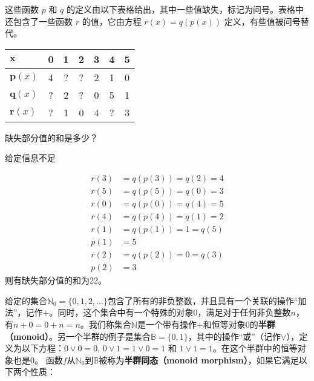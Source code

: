\documentclass[answers]{exam}
\begin{document}
\begin{questions}
	\question 这些函数 \( p \) 和 \( q \) 的定义由以下表格给出，其中一些值缺失，标记为问号。表格中还包含了一些函数 \( r
	\) 的值，它由方程 \( r(x) = q(p(x)) \) 定义，有些值被问号替代。

	\begin{tabularx}{0.8\textwidth}{|B|C|C|C|C|C|C|} \hline
		\(\mathbf x \)    & \textbf{0} & \textbf{1} & \textbf{2} & \textbf{3} & \textbf{4} & \textbf{5} \\ \hline
		\(\mathbf p(x) \) & 4          & ?          & ?          & 2          & 1          & 0          \\ \hline
		\(\mathbf q(x) \) & ?          & 2          & ?          & 0          & 5          & 1          \\ \hline
		\(\mathbf r(x) \) & ?          & 1          & 0          & 4          & ?          & 3          \\ \hline
	\end{tabularx}

	缺失部分值的和是多少？

	\begin{oneparchoices}
		    \choice 给定信息不足
	\end{oneparchoices}

	\begin{solution}
		\begin{align*}
			r(3) & = q(p(3)) = q(2) = 4   \\
			r(5) & = q(p(5)) = q(0) = 3   \\
			r(0) & = q(p(0)) = q(4) = 5   \\
			r(4) & = q(p(4)) = q(1) = 2   \\
			r(1) & = q(p(1)) = 1   = q(5) \\
			p(1) & = 5                    \\
			r(2) & = q(p(2)) = 0 = q(3)   \\
			p(2) & = 3
		\end{align*}
		则有缺失部分值的和为22。
	\end{solution}

	\question 给定的集合$\mathbb{N}_0 = \{0, 1, 2,
		\ldots\}$包含了所有的非负整数，并且具有一个关联的操作“加法”，记作$+$。同时，这个集合中有一个特殊的对象$0$，满足对于任何非负整数$n$，有$n
		+ 0 = 0 + n = n$。我们称集合$\mathbb{N}$是一个带有操作$+$和恒等对象$0$的\textbf{半群（monoid）}。另一个半群的例子是集合$\mathbb{B} = \{0, 1\}$，其中的操作“或”（记作$\vee$），定义为以下方程：$0 \vee 0 = 0$, $0 \vee 1 = 1 \vee 0 = 1$ 和 $1 \vee 1 = 1$。在这个半群中的恒等对象也是$0$。
	函数$f$从$\mathbb{N}_0$到$\mathbb{B}$被称为\textbf{半群同态（monoid morphism）}，如果它满足以下两个性质：


\end{questions}
\end{document}
